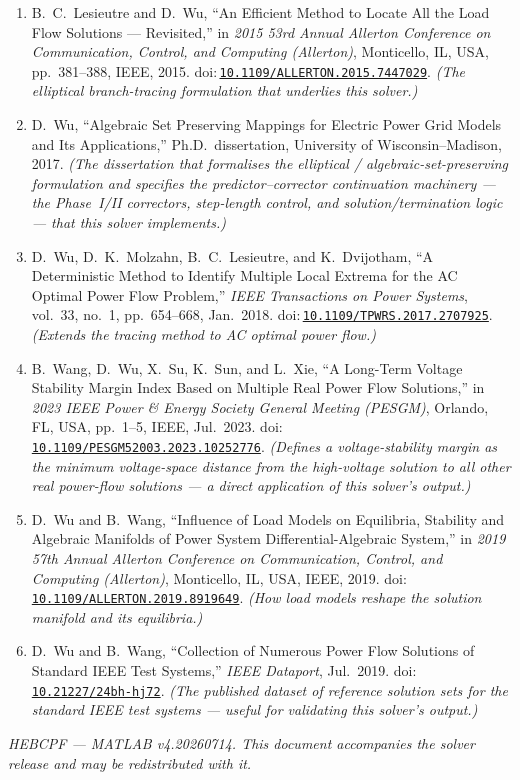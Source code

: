 \documentclass[11pt,a4paper]{article}
\newcommand{\doi}[1]{\href{https://doi.org/#1}{\nolinkurl{#1}}}
\begin{document}
\begin{enumerate}[leftmargin=1.6em]
\item B.\ C.\ Lesieutre and D.\ Wu, ``An Efficient Method to Locate All the Load Flow
      Solutions --- Revisited,'' in \emph{2015 53rd Annual Allerton Conference on
      Communication, Control, and Computing (Allerton)}, Monticello, IL, USA, pp.~381--388,
      IEEE, 2015. doi:\,\doi{10.1109/ALLERTON.2015.7447029}. \emph{(The elliptical
      branch-tracing formulation that underlies this solver.)}
\item D.\ Wu, ``Algebraic Set Preserving Mappings for Electric Power Grid Models and Its
      Applications,'' Ph.D.\ dissertation, University of Wisconsin--Madison, 2017.
      \emph{(The dissertation that formalises the elliptical / algebraic-set-preserving
      formulation and specifies the predictor--corrector continuation machinery --- the
      Phase~I/II correctors, step-length control, and solution/termination logic --- that
      this solver implements.)}
\item D.\ Wu, D.\ K.\ Molzahn, B.\ C.\ Lesieutre, and K.\ Dvijotham, ``A Deterministic
      Method to Identify Multiple Local Extrema for the AC Optimal Power Flow Problem,''
      \emph{IEEE Transactions on Power Systems}, vol.~33, no.~1, pp.~654--668, Jan.\ 2018.
      doi:\,\doi{10.1109/TPWRS.2017.2707925}.
      \emph{(Extends the tracing method to AC optimal power flow.)}
\item B.\ Wang, D.\ Wu, X.\ Su, K.\ Sun, and L.\ Xie, ``A Long-Term Voltage Stability
      Margin Index Based on Multiple Real Power Flow Solutions,'' in \emph{2023 IEEE Power
      \& Energy Society General Meeting (PESGM)}, Orlando, FL, USA, pp.~1--5, IEEE,
      Jul.\ 2023. doi:\,\doi{10.1109/PESGM52003.2023.10252776}.
      \emph{(Defines a voltage-stability margin as the
      minimum voltage-space distance from the high-voltage solution to all other real
      power-flow solutions --- a direct application of this solver's output.)}
\item D.\ Wu and B.\ Wang, ``Influence of Load Models on Equilibria, Stability and
      Algebraic Manifolds of Power System Differential-Algebraic System,'' in \emph{2019
      57th Annual Allerton Conference on Communication, Control, and Computing
      (Allerton)}, Monticello, IL, USA, IEEE, 2019.
      doi:\,\doi{10.1109/ALLERTON.2019.8919649}. \emph{(How load models reshape the
      solution manifold and its equilibria.)}
\item D.\ Wu and B.\ Wang, ``Collection of Numerous Power Flow Solutions of Standard IEEE
      Test Systems,'' \emph{IEEE Dataport}, Jul.\ 2019.
      doi:\,\doi{10.21227/24bh-hj72}. \emph{(The published dataset of reference solution
      sets for the standard IEEE test systems --- useful for validating this solver's
      output.)}
\end{enumerate}

\vfill
\begin{center}\small\itshape
HEBCPF --- MATLAB v4.20260714. This document accompanies the solver release and may be
redistributed with it.
\end{center}
\end{document}
